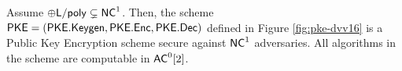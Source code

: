 

\begin{theorem}
Assume $\fgAssump$. Then, the scheme $\PKE = (\PKEKeygen, \PKEEnc, \PKEDec)$ defined in Figure \ref{fig:pke-dvv16} is a Public Key Encryption scheme secure against $\NC^1$ adversaries. All algorithms in the scheme are computable in $\ACzt$.
\end{theorem}

